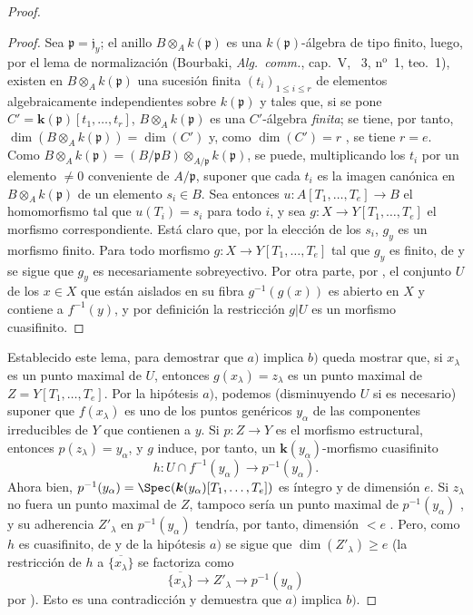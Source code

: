 \begin{proof}
\begin{proof}
Sea $\mathfrak{p}=\mathfrak{j}_y$; el anillo $B\otimes_A k(\mathfrak{p})$ es una $k(\mathfrak{p})$-álgebra de tipo finito, luego, por el lema de normalización (Bourbaki, \emph{Alg.\ comm.}, cap.~V, \textsection~3, n$^{\text{o}}$~1, teo.~1), existen en $B\otimes_A k(\mathfrak{p})$ una sucesión finita $(t_i)_{1\leq i\leq r}$ de elementos algebraicamente independientes sobre $k(\mathfrak{p})$ y tales que, si se pone $C'=\boldsymbol k(\mathfrak{p})[t_1,\ldots,t_r]$, $B\otimes_A k(\mathfrak{p})$ es una $C'$-álgebra \emph{finita}; se tiene, por tanto, $\dim(B\otimes_A k(\mathfrak{p}))=\dim(C')$  y, como $\dim(C')=r$ , se tiene $r=e$.
Como $B\otimes_A k(\mathfrak{p})=(B/\mathfrak{p}B)\otimes_{A/\mathfrak{p}}k(\mathfrak{p})$, se puede, multiplicando los $t_i$ por un elemento $\neq0$
conveniente de $A/\mathfrak{p}$, suponer que cada $t_i$ es la imagen canónica en $B\otimes_A k(\mathfrak{p})$ de un elemento $s_i\in B$.
Sea entonces $u:A[T_1,\ldots,T_e]\to B$ el homomorfismo tal que $u(T_i)=s_i$ para todo $i$, y sea $g:X\to Y[T_1,\ldots,T_e]$ el morfismo correspondiente.
Está claro que, por la elección de los $s_i$, $g_y$ es un morfismo finito.
Para todo morfismo $g:X\to Y[T_1,\ldots,T_e]$ tal que $g_y$ es finito, de  y  se sigue que $g_y$ es necesariamente sobreyectivo.
Por otra parte, por , el conjunto $U$ de los $x\in X$ que están aislados en su fibra $g^{-1}(g(x))$ es abierto en $X$ y contiene a $f^{-1}(y)$, y por definición la restricción $g|U$ es un morfismo cuasifinito.
\end{proof}

Establecido este lema, para demostrar que $a)$ implica $b)$ queda mostrar que, si $x_\lambda$ es un punto maximal de $U$, entonces $g(x_\lambda)=z_\lambda$ es un punto maximal de $Z=Y[T_1,\ldots,T_e]$.
Por la hipótesis $a)$, podemos (disminuyendo $U$ si es necesario) suponer que $f(x_\lambda)$ es uno de los puntos genéricos $y_\alpha$ de las componentes irreducibles de $Y$ que contienen a $y$. Si $p:Z\to Y$ es el morfismo estructural, entonces $p(z_\lambda)=y_\alpha$, y $g$ induce, por tanto, un $\boldsymbol k(y_\alpha)$-morfismo cuasifinito
\[
h:U\cap f^{-1}(y_\alpha)\longrightarrow p^{-1}(y_\alpha).
\]
Ahora bien, $p^{-1}(y_\alpha)=\Spec(\boldsymbol k(y_\alpha)[T_1,\ldots,T_e])$ es íntegro y de dimensión $e$. Si $z_\lambda$ no fuera un punto maximal de $Z$, tampoco sería un punto maximal de $p^{-1}(y_\alpha)$ , y su adherencia $Z'_\lambda$ en $p^{-1}(y_\alpha)$ tendría, por tanto, dimensión $<e$ . Pero, como $h$ es cuasifinito, de  y de la hipótesis $a)$ se sigue que $\dim(Z'_\lambda)\geq e$ (la restricción de $h$ a $\overline{\{x_\lambda\}}$ se factoriza como
\[
\overline{\{x_\lambda\}}\longrightarrow Z'_\lambda\longrightarrow p^{-1}(y_\alpha)
\]
por ). Esto es una contradicción y demuestra que $a)$ implica $b)$.


\end{proof}
